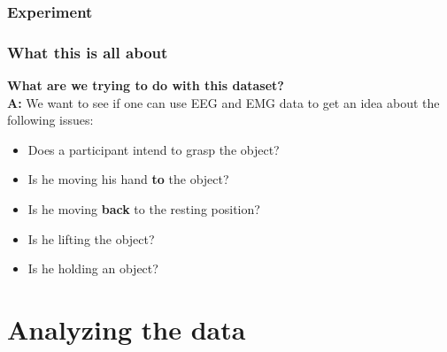 \documentclass{beamer}
\begin{document}
%

\begin{frame}
    \frametitle{Experiment}
    \begin{figure}
    \end{figure}
\end{frame}


\begin{frame}
	\frametitle{What this is all about}
	\textbf{What are we trying to do with this dataset?}\\
	\textbf{A:} We want to see if one can use EEG and EMG data to get an idea about the following issues: 
	
	\begin{itemize}
		\item Does a participant intend to grasp the object?
		\item Is he moving his hand \textbf{to} the object?
		\item Is he moving \textbf{back} to the resting position?
		\item Is he lifting the object?
		\item Is he holding an object?
	\end{itemize}
	
\end{frame}



\section{Analyzing the data}
\end{document}
